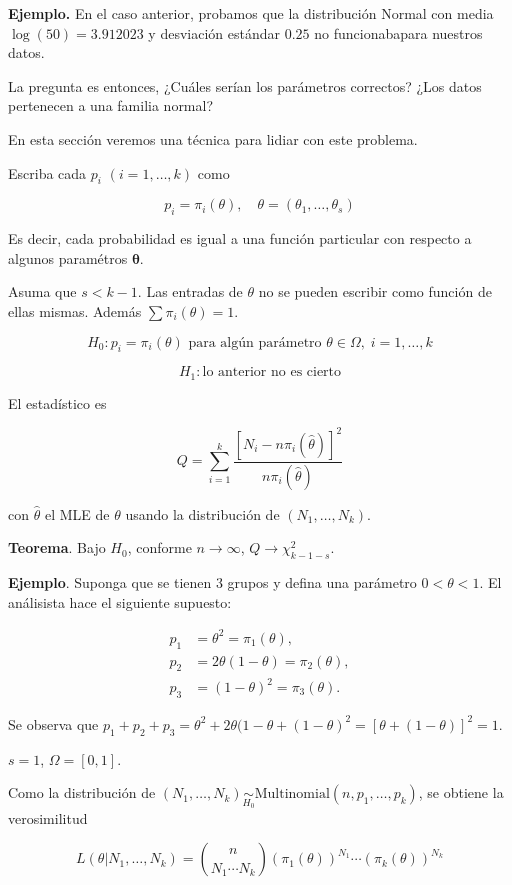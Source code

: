 \documentclass[
  12pt,
]{book}
\begin{document}
\textbf{Ejemplo.} En el caso anterior, probamos que la distribución Normal con media \(\log(50) = 3.912023\) y desviación estándar \(0.25\) no funcionabapara nuestros datos.

La pregunta es entonces, ¿Cuáles serían los parámetros correctos? ¿Los datos
pertenecen a una familia normal?

En esta sección veremos una técnica para lidiar con este problema.

Escriba cada \(p_i\) \((i=1,\dots,k)\) como

\[p_i = \pi_i(\theta),\quad \theta = (\theta_1,\dots,\theta_s)\]

Es decir, cada probabilidad es igual a una función particular con respecto a
algunos paramétros \(\mathbf{\theta}\).

Asuma que \(s<k-1\). Las entradas de \(\theta\) no se pueden escribir como función
de ellas mismas. Además \(\sum \pi_i(\theta) = 1\).

\[H_0: p_i = \pi_i(\theta)\text{ para algún parámetro }\theta\in
\Omega,\;i=1,\dots,k\]

\[H_1: \text{lo anterior no es cierto}\]

El estadístico es

\[Q = \sum_{i=1}^k\dfrac{[N_i-n\pi_i(\hat\theta)]^2}{n\pi_i(\hat\theta)}\]

con \(\hat\theta\) el MLE de \(\theta\) usando la distribución de \((N_1,\dots,N_k)\).

\textbf{Teorema}. Bajo \(H_0\), conforme \(n\to \infty\), \(Q\to \chi^2_{k-1-s}\).

\textbf{Ejemplo}. Suponga que se tienen 3 grupos y defina una parámetro \(0<\theta<1\).
El análisista hace el siguiente supuesto:

\begin{align*}
p_1 &= \theta^2=\pi_1(\theta)  , \\
p_2 &= 2\theta(1-\theta)=\pi_2(\theta),\\
p_3 &= (1-\theta)^2=\pi_3(\theta).
\end{align*}

Se observa que \(p_1+p_2+p_3 = \theta^2 + 2\theta (1-\theta +(1-\theta)^2 =[\theta+(1-\theta)]^2 = 1\).

\(s = 1\), \(\Omega = [0,1]\).

Como la distribución de
\((N_1,\dots,N_k)\underset{H_0}{\sim} \text{Multinomial}(n,p_1,\dots,p_k)\), se
obtiene la verosimilitud

\[L (\theta|N_1,\dots,N_k) = {n \choose {N_1\cdots N_k}}(\pi_1(\theta))^{N_1}\cdots(\pi_k(\theta))^{N_k}\]
\end{document}
